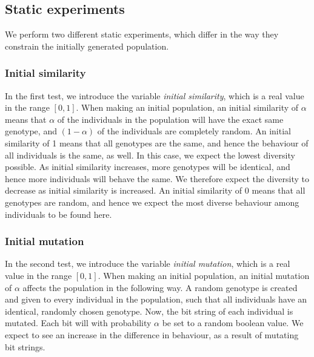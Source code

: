 \subsection{Static experiments}
We perform two different static experiments, which differ in the way they constrain the initially generated population. 

\subsubsection{Initial similarity}
In the first test, we introduce the variable \emph{initial similarity}, which is a real value in the range $[0,1]$.
When making an initial population, an initial similarity of $\alpha$ means that $\alpha$ of the individuals in the population will have the exact same genotype, and $(1 - \alpha)$ of the individuals are completely random.
An initial similarity of \num{1} means that all genotypes are the same, and hence the behaviour of all individuals is the same, as well. In this case, we expect the lowest diversity possible.
As initial similarity increases, more genotypes will be identical, and hence more individuals will behave the same.
We therefore expect the diversity to decrease as initial similarity is increased.
An initial similarity of \num{0} means that all genotypes are random, and hence we expect the most diverse behaviour among individuals to be found here.

\subsubsection{Initial mutation}
In the second test, we introduce the variable \emph{initial mutation}, which is a real value in the range $[0,1]$.
When making an initial population, an initial mutation of $\alpha$ affects the population in the following way.
A random genotype is created and given to every individual in the population, such that all individuals have an identical, randomly chosen genotype.
Now, the bit string of each individual is mutated. Each bit will with probability $\alpha$ be set to a random boolean value. 
We expect to see an increase in the difference in behaviour, as a result of mutating bit strings. 

